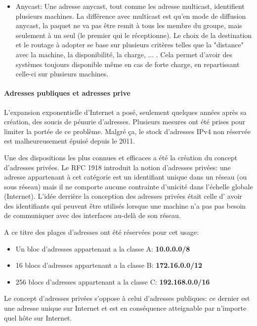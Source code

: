 \begin{itemize}
\item Anycast: Une adresse anycast, tout comme les adresse multicast, identifient plusieurs machines. La différence avec multicast
est qu'en mode de diffusion anycast, la paquet ne va pas être remit à tous les membre du groupe, mais seulement à un seul (le premier qui le réceptionne).
Le choix de la destination et le routage à adopter se base sur plusieurs critères telles que la "distance" avec la machine, la disponibilité,
la charge, ... . Cela permet d'avoir des systèmes toujours disponible même en cas de forte charge, en repartissant celle-ci sur
plusieurs machines.
\end{itemize}



\paragraph{Adresses publiques et adresses prive}
L'expansion exponentielle d'Internet a posé, seulement quelques années après sa création, des
soucis de pénurie d'adresses. Plusieurs mesures ont été prises pour limiter la
portée de ce problème. Malgré ça, le stock d'adresses IPv4 non réservée
est malheureusement épuisé depuis le 2011.

Une des dispositions les plus connues et efficaces a été la création du concept
d'adresses privées. Le RFC 1918 introduit la notion d'adresses privées: une adresse
appartenant à cet catégorie est un identifiant unique dans un réseau (ou sous
réseau) mais il ne comporte aucune contrainte d'unicité dans l'échelle globale
(Internet). L'idée derrière la conception des adresses privées était celle d'
avoir des identifiants qui peuvent être utilisés lorsque une machine n'a pas
pas besoin de communiquer avec des interfaces au-delà de son réseau.

A ce titre des plages d'adresses ont été réservées pour cet usage:

\begin{itemize}
\item Un bloc d'adresses appartenant a la classe A: \textbf{10.0.0.0/8}
\item 16 blocs d'adresses appartenant a la classe B: \textbf{172.16.0.0/12}
\item 256 blocs d'adresses appartenant a la classe C: \textbf{192.168.0.0/16}
\end{itemize}

\smallbreak
Le concept d'adresses privées s'oppose à celui d'adresses publiques: ce dernier est 
une adresse unique sur Internet et est en conséquence atteignable par n'importe
quel hôte sur Internet.

